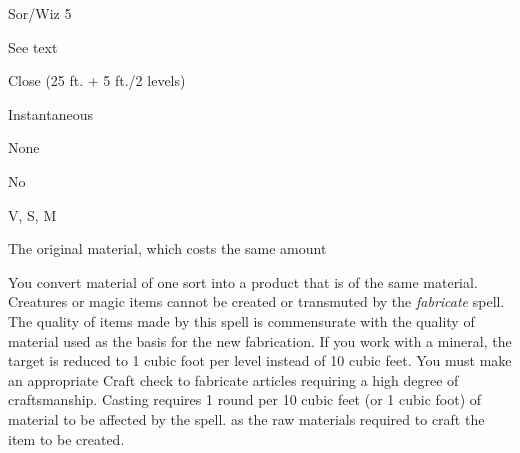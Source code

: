 
\begin{description*}
\item[Level:] Sor/Wiz 5
\item[Casting Time:] See text
\item[Range:] Close (25 ft. + 5 ft./2 levels)
\item[Duration:] Instantaneous
\item[Saving Throw:] None
\item[Spell Resistance:] No
\item[Components:] V, S, M
\item[Arcane Material Component:] The original material, which costs the same amount
\end{description*}

You convert material of one sort into a product that is of the same material. Creatures
or magic items cannot be created or transmuted by the \textit{fabricate} spell.
The quality of items made by this spell is commensurate with the quality of material
used as the basis for the new fabrication. If you work with a mineral, the target
is reduced to 1 cubic foot per level instead of 10 cubic feet.
You must make an appropriate Craft check to fabricate articles requiring a high
degree of craftsmanship.
Casting requires 1 round per 10 cubic feet (or 1 cubic foot) of material to be
affected by the spell.
as the raw materials required to craft the item to be created.